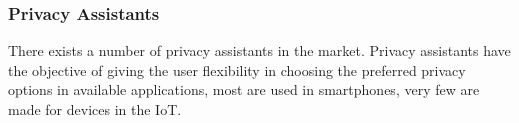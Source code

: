 

\subsubsection{Privacy Assistants}

There exists a number of privacy assistants in the market. Privacy assistants
have the objective of giving the user flexibility in choosing the preferred
privacy options in available applications, most are used in smartphones,
very few are made for devices in the IoT.

